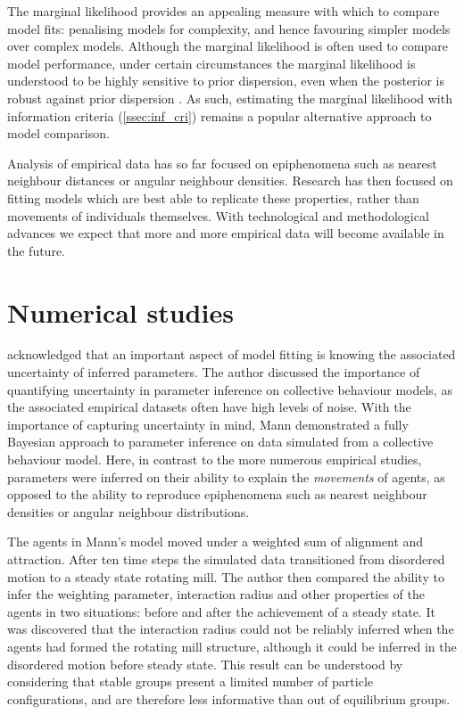 The marginal likelihood provides an appealing measure with which to compare
model fits: penalising models for complexity, and hence favouring simpler
models over complex models. Although the marginal likelihood is often used to
compare model performance, under certain circumstances the marginal likelihood
is understood to be highly sensitive to prior dispersion, even when the
posterior is robust against prior dispersion \parencite{fong20}. As such,
estimating the marginal likelihood with information criteria
(\cref{ssec:inf_cri}) remains a popular alternative approach to model
comparison.

Analysis of empirical data has so far focused on epiphenomena such as nearest
neighbour distances or angular neighbour densities. Research has then focused
on fitting models which are best able to replicate these properties, rather
than movements of individuals themselves. With technological and methodological
advances we expect that more and more empirical data will become available in
the future.

\section{Numerical studies}
\label{sec:numerical_studies}

\textcite{mann11} acknowledged that an important aspect of model fitting is
knowing the associated uncertainty of inferred parameters. The author discussed
the importance of quantifying uncertainty in parameter inference on collective
behaviour models, as the associated empirical datasets often have high levels
of noise. With the importance of capturing uncertainty in mind, Mann
demonstrated a fully Bayesian approach to parameter inference on data simulated
from a collective behaviour model. Here, in contrast to the more numerous
empirical studies, parameters were inferred on their ability to explain the
\emph{movements} of agents, as opposed to the ability to reproduce epiphenomena
such as nearest neighbour densities or angular neighbour distributions.

The agents in Mann's model moved under a weighted sum of alignment and
attraction. After ten time steps the simulated data transitioned from
disordered motion to a steady state rotating mill. The author then compared the
ability to infer the weighting parameter, interaction radius and other
properties of the agents in two situations: before and after the achievement of
a steady state. It was discovered that the interaction radius could not be
reliably inferred when the agents had formed the rotating mill structure,
although it could be inferred in the disordered motion before steady state.
This result can be understood by considering that stable groups present a
limited number of particle configurations, and are therefore less informative
than out of equilibrium groups.

